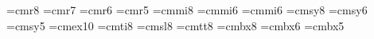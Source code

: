 

\font\eightrm=cmr8
\font\sevenrm=cmr7
\font\sixrm=cmr6
\font\fiverm=cmr5
\font\eighti=cmmi8
\font\sixi=cmmi6
\font\fivei=cmmi6
\font\eightsy=cmsy8
\font\sixsy=cmsy6
\font\fivesy=cmsy5
\font\tenex=cmex10
\font\eightit=cmti8
\font\eightsl=cmsl8
\font\eighttt=cmtt8
\font\eightbf=cmbx8
\font\sixbf=cmbx6
\font\fivebf=cmbx5


\def\eightpoint{\def\rm{\fam0\eightrm}%
  \textfont0=\eightrm \scriptfont0=\sixrm \scriptscriptfont0=\fiverm
  \textfont1=\eighti \scriptfont1=\sixi \scriptscriptfont0=\fivei
  \textfont2=\eightsy \scriptfont2=\sixsy \scriptscriptfont2=\fivesy
  \textfont3=\tenex \scriptfont3=\tenex \scriptscriptfont3=\tenex
  \textfont\itfam=\eightit  \def\it{\fam\itfam\eightit}%
  \textfont\slfam=\eightsl  \def\sl{\fam\slfam\eightsl}%
  \textfont\ttfam=\eighttt  \def\tt{\fam\ttfam\eighttt}%
  \textfont\bffam=\eightbf  \scriptfont\bffam=\sixbf
   \scriptscriptfont\bffam=\fivebf  \def\bf{\fam\bffam\eightbf}%
  \normalbaselineskip=9pt
  \setbox\strutbox=\hbox{\vrule height7pt depth2pt width0pt}%
  \let\sc=\sixrm  \normalbaselines\rm}



